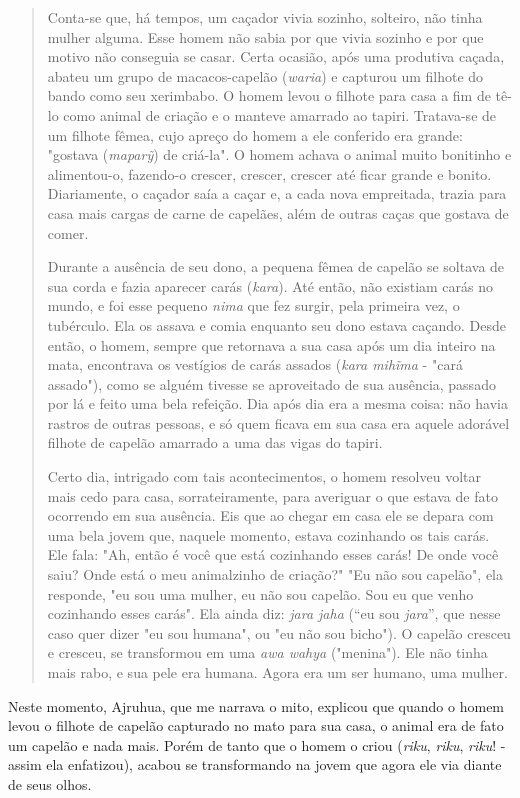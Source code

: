 \begin{quote}
Conta-se que, há tempos, um caçador vivia sozinho, solteiro, não tinha
mulher alguma. Esse homem não sabia por que vivia sozinho e por que
motivo não conseguia se casar. Certa ocasião, após uma produtiva caçada,
abateu um grupo de macacos-capelão (\emph{waria}) e capturou um filhote
do bando como seu xerimbabo. O homem levou o filhote para casa a fim de
tê-lo como animal de criação e o manteve amarrado ao tapiri. Tratava-se
de um filhote fêmea, cujo apreço do homem a ele conferido era grande:
"gostava (\emph{maparỹ}) de criá-la". O homem achava o animal muito
bonitinho e alimentou-o, fazendo-o crescer, crescer, crescer até ficar
grande e bonito. Diariamente, o caçador saía a caçar e, a cada nova
empreitada, trazia para casa mais cargas de carne de capelães, além de
outras caças que gostava de comer.

Durante a ausência de seu dono, a pequena fêmea de capelão se soltava de
sua corda e fazia aparecer carás (\emph{kara}). Até então, não existiam
carás no mundo, e foi esse pequeno \emph{nima} que fez surgir, pela
primeira vez, o tubérculo. Ela os assava e comia enquanto seu dono
estava caçando. Desde então, o homem, sempre que retornava a sua casa
após um dia inteiro na mata, encontrava os vestígios de carás assados
(\emph{kara mihĩma} - "cará assado"), como se alguém tivesse se
aproveitado de sua ausência, passado por lá e feito uma bela refeição.
Dia após dia era a mesma coisa: não havia rastros de outras pessoas, e
só quem ficava em sua casa era aquele adorável filhote de capelão
amarrado a uma das vigas do tapiri.

Certo dia, intrigado com tais acontecimentos, o homem resolveu voltar
mais cedo para casa, sorrateiramente, para averiguar o que estava de
fato ocorrendo em sua ausência. Eis que ao chegar em casa ele se depara
com uma bela jovem que, naquele momento, estava cozinhando os tais
carás. Ele fala: "Ah, então é você que está cozinhando esses carás! De
onde você saiu? Onde está o meu animalzinho de criação?" "Eu não sou
capelão", ela responde, "eu sou uma mulher, eu não sou capelão. Sou eu
que venho cozinhando esses carás". Ela ainda diz: \emph{jara jaha} (``eu
sou \emph{jara}'', que nesse caso quer dizer "eu sou humana", ou "eu não
sou bicho"). O capelão cresceu e cresceu, se transformou em uma
\emph{awa wahya} ("menina"). Ele não tinha mais rabo, e sua pele era
humana. Agora era um ser humano, uma mulher.
\end{quote}

Neste momento, Ajruhua, que me narrava o mito, explicou que quando o
homem levou o filhote de capelão capturado no mato para sua casa, o
animal era de fato um capelão e nada mais. Porém de tanto que o homem o
criou (\emph{riku}, \emph{riku}, \emph{riku}! - assim ela enfatizou),
acabou se transformando na jovem que agora ele via diante de seus olhos.

